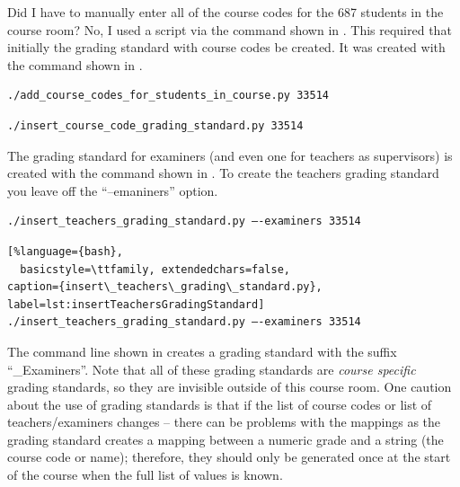Did I have to manually enter all of the course codes for the 687 students in the course room? No, I used a script via the command shown in .  This required that initially the grading standard with course codes be created. It was created with the command shown in .
\begin{lstlisting}[language={bash}, caption={add\_course\_codes\_for\_students\_in\_course.py}, label=lst:addCourseCodesForStudentsInCourse]
./add_course_codes_for_students_in_course.py 33514
\end{lstlisting}
\begin{lstlisting}[language={bash}, caption={insert\_course\_code\_grading\_standard.py}, label=lst:insertCourseCodeGradingStandard]
./insert_course_code_grading_standard.py 33514
\end{lstlisting}
The grading standard for examiners (and even one for teachers as supervisors) is created with the command shown in  . To create the teachers grading standard you leave off the ``--emaniners'' option.

\ifxeorlua
\begin{lstlisting}[language={bash}, caption={insert\_teachers\_grading\_standard.py}, label=lst:insertTeachersGradingStandard]
./insert_teachers_grading_standard.py –-examiners 33514
\end{lstlisting}
\else
\begin{lstlisting}[%language={bash}, 
  basicstyle=\ttfamily, extendedchars=false,
caption={insert\_teachers\_grading\_standard.py}, label=lst:insertTeachersGradingStandard]
./insert_teachers_grading_standard.py –-examiners 33514
\end{lstlisting}
\fi

The command line shown in  creates a grading standard with the suffix “\_Examiners”. Note that all of these grading standards are \textit{course specific} grading standards, so they are invisible outside of this course room. One caution about the use of grading standards is that if the list of course codes or list of teachers/examiners changes – there can be problems with the mappings as the grading standard creates a mapping between a numeric grade and a string (the course code or name); therefore, they should only be generated once at the start of the course when the full list of values is known.


